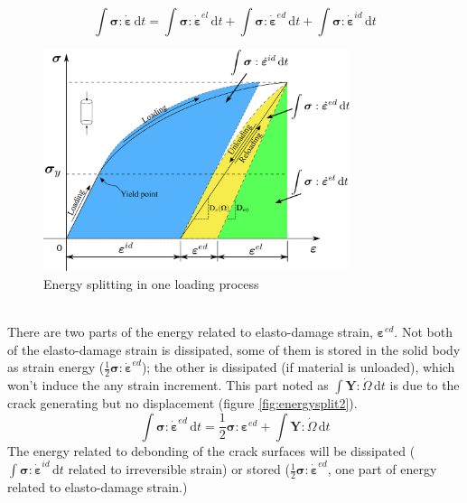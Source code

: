 \documentclass[preprint,review,12pt]{elsarticle}
\newcommand{\ud}{\textrm{d}}
\begin{document}
%
\begin{equation}
  \label{eq:econserv}
   \int\bm\sigma:\dot{\bm\varepsilon}\,\ud t = \int\bm\sigma:\dot{\bm\varepsilon}^{el}\,\ud t +
   \int\bm\sigma:\dot{\bm\varepsilon}^{ed}\,\ud t + \int\bm\sigma:\dot{\bm\varepsilon}^{id}\,\ud t
\end{equation}
%
\begin{figure}[htbp]
   \centering
   \includegraphics[width=0.8\textwidth]{inkscape/energy_split/energy_split.eps}
   \caption{Energy splitting in one loading process}
   \label{fig:energysplit1}
\end{figure}
\
\\
There are two parts of the energy related to elasto-damage strain, $\bm\varepsilon^{ed}$. Not both of the elasto-damage strain is dissipated, some of them is stored in the solid body as strain energy ($\frac{1}{2}\bm\sigma:\dot{\bm\varepsilon}^{ed}$); the other is dissipated (if material is unloaded), which won't induce the any strain increment. This part noted as $\int \bm{Y}:\dot{\bm\varOmega}\,\ud t$ is due to the crack generating but no displacement (figure \ref{fig:energysplit2}).
%
\begin{equation}\label{eq:esplit1}
   \int\bm\sigma:\dot{\bm\varepsilon}^{ed}\,\ud t = \frac{1}{2}\bm\sigma:\bm\varepsilon^{ed} +
   \int\bm{Y}:\dot{\bm\varOmega}\,\ud t
\end{equation}
%
The energy related to debonding of the crack surfaces will be dissipated ($\int \bm\sigma:\dot{\bm\varepsilon}^{id}\,\ud t$ related to irreversible strain) or stored ($\frac{1}{2}\bm\sigma:\dot{\bm\varepsilon}^{ed}$, one part of energy related to elasto-damage strain.)
\end{document}
